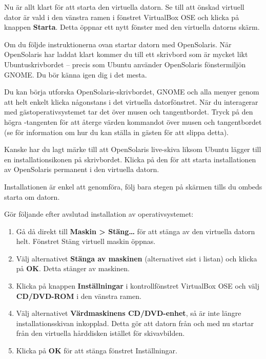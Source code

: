 \documentclass[a4paper,final]{memoir} %
\begin{document}

Nu är allt klart för att starta den virtuella datorn. Se till att önskad virtuell dator är vald i den vänstra ramen i fönstret VirtualBox OSE och klicka på knappen \textbf{Starta}. Detta öppnar ett nytt fönster med den virtuella datorns skärm.

Om du följde instruktionerna ovan startar datorn med OpenSolaris. När OpenSolaris har laddat klart kommer du till ett skrivbord som är mycket likt Ubuntuskrivbordet -- precis som Ubuntu använder OpenSolaris fönstermiljön GNOME. Du bör känna igen dig i det mesta.

Du kan börja utforska OpenSolaris-skrivbordet, GNOME och alla menyer genom att helt enkelt klicka någonstans i det virtuella datorfönstret. När du interagerar med gästoperativsystemet tar det över musen och tangentbordet. Tryck på den högra -tangenten för att återge värden kommandot över musen och tangentbordet (se  för information om hur du kan ställa in gästen för att slippa detta). 

Kanske har du lagt märke till att OpenSolaris live-skiva liksom Ubuntu lägger till en installationsikonen på skrivbordet. Klicka på den för att starta installationen av OpenSolaris permanent i den virtuella datorn. 

Installationen är enkel att genomföra, följ bara stegen på skärmen tills du ombeds starta om datorn. 

Gör följande efter avslutad installation av operativsystemet:

\begin{enumerate}

\item Gå då direkt till \textbf{Maskin \textgreater{} Stäng\ldots{}} för att stänga av den virtuella datorn helt. Fönstret Stäng virtuell maskin öppnas.

\item Välj alternativet \textbf{Stänga av maskinen} (alternativet sist i listan) och klicka på \textbf{OK}. Detta stänger av maskinen.

\item Klicka på knappen \textbf{Inställningar} i kontrollfönstret VirtualBox OSE och välj \textbf{CD/DVD-ROM} i den vänstra ramen.

\item Välj alternativet \textbf{Värdmaskinens CD/DVD-enhet}, så är inte längre installationsskivan inkopplad. Detta gör att datorn från och med nu startar från den virtuella hårddisken istället för skivavbilden. 

\item Klicka på \textbf{OK} för att stänga fönstret Inställningar.

\end{enumerate}
\end{document}
